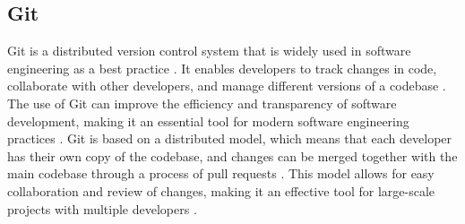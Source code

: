 \subsection{Git}
Git is a distributed version control system that is widely used in software engineering as a best practice \cite{loeliger2012version}. It enables developers to track changes in code, collaborate with other developers, and manage different versions of a codebase \cite{loeliger2012version}. The use of Git can improve the efficiency and transparency of software development, making it an essential tool for modern software engineering practices \cite{loeliger2012version}. Git is based on a distributed model, which means that each developer has their own copy of the codebase, and changes can be merged together with the main codebase through a process of pull requests \cite{loeliger2012version}. This model allows for easy collaboration and review of changes, making it an effective tool for large-scale projects with multiple developers \cite{loeliger2012version}.


